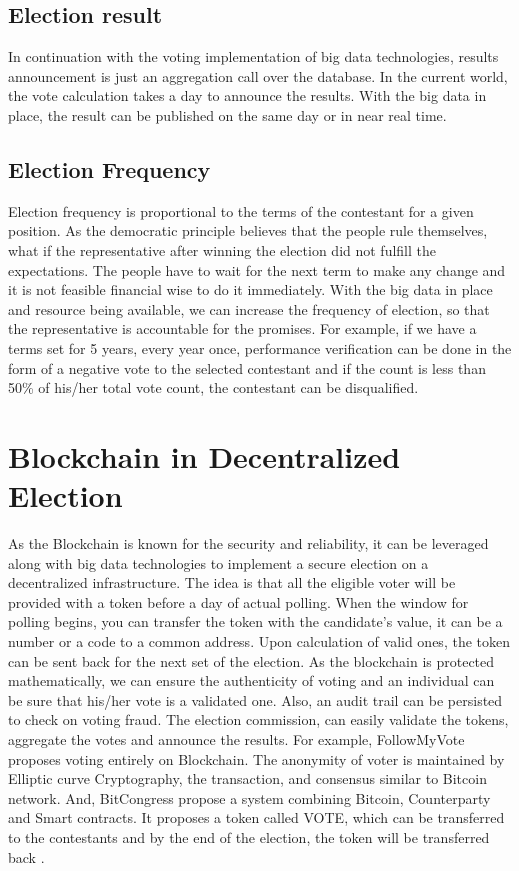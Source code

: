 \documentclass[sigconf]{acmart}
\begin{document}
\subsection{Election result}
In continuation with the voting implementation of big data technologies, results announcement is just an aggregation call over the database. In the current world, the vote calculation takes a day to announce the results. With the big data in place, the result can be published on the same day or in near real time.

\subsection{Election Frequency}
Election frequency is proportional to the terms of the contestant for a given position. As the democratic principle believes that the people rule themselves, what if the representative after winning the election did not fulfill the expectations. The people have to wait for the next term to make any change and it is not feasible financial wise to do it immediately. With the big data in place and resource being available, we can increase the frequency of election, so that the representative is accountable for the promises. For example, if we have a terms set for 5 years, every year once, performance verification can be done in the form of a negative vote to the selected contestant and if the count is less than 50\% of his/her total vote count, the contestant can be disqualified.


\section{Blockchain in Decentralized Election}
As the Blockchain is known for the security and reliability, it can be leveraged along with big data technologies to implement a secure election on a decentralized infrastructure. The idea is that all the eligible voter will be provided with a token before a day of actual polling. When the window for polling begins, you can transfer the token with the candidate's value, it can be a number or a code to a common address. Upon calculation of valid ones, the token can be sent back for the next set of the election. As the blockchain is protected mathematically, we can ensure the authenticity of voting and an individual can be sure that his/her vote is a validated one. Also, an audit trail can be persisted to check on voting fraud. The election commission, can easily validate the tokens, aggregate the votes and announce the results\cite{17}.  
For example, FollowMyVote proposes voting entirely on Blockchain. The anonymity of voter is maintained by Elliptic curve Cryptography\cite{16:online}, the transaction, and consensus similar to Bitcoin network. And, BitCongress propose a system combining Bitcoin, Counterparty and Smart contracts. It proposes a token called VOTE, which can be transferred to the contestants and by the end of the election, the token will be transferred back \cite{18:online}.
\end{document}
